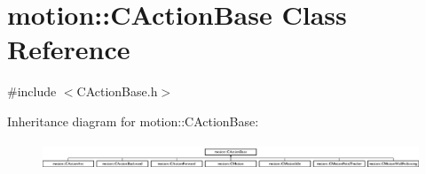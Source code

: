 \hypertarget{classmotion_1_1CActionBase}{}\section{motion\+:\+:C\+Action\+Base Class Reference}
\label{classmotion_1_1CActionBase}


{\ttfamily \#include $<$C\+Action\+Base.\+h$>$}

Inheritance diagram for motion\+:\+:C\+Action\+Base\+:\begin{figure}[H]
\begin{center}
\leavevmode
\includegraphics[height=0.855615cm]{classmotion_1_1CActionBase}
\end{center}
\end{figure}
